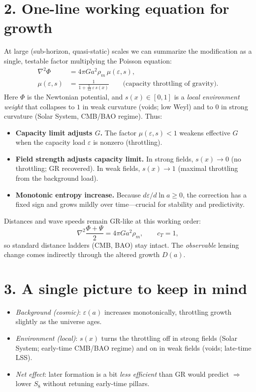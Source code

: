 \documentclass[aps,prd,onecolumn,superscriptaddress,nofootinbib]{revtex4-2}
\newcommand{\eps}{\varepsilon}
\begin{document}
\section*{2. One-line working equation for growth}
At large (sub-horizon, quasi-static) scales we can summarize the modification as a single, testable factor multiplying the Poisson equation:
\begin{align}
\nabla^2\Phi &= 4\pi G a^2 \rho_m \,\mu(\eps,s), \\
\mu(\eps,s) &= \frac{1}{1+\frac{5}{12}\,\eps\,s(x)} \qquad \text{(capacity throttling of gravity)}.
\end{align}
Here $\Phi$ is the Newtonian potential, and $s(x)\!\in[0,1]$ is a \emph{local environment weight} that collapses to $1$ in weak curvature (voids; low Weyl) and to $0$ in strong curvature (Solar System, CMB/BAO regime). Thus:

\begin{itemize}
\item \textbf{Capacity limit adjusts $G$.} The factor $\mu(\eps,s)<1$ weakens effective $G$ when the capacity load $\eps$ is nonzero (throttling).
\item \textbf{Field strength adjusts capacity limit.} In strong fields, $s(x)\!\to\!0$ (no throttling; GR recovered). In weak fields, $s(x)\!\to\!1$ (maximal throttling from the background load).
\item \textbf{Monotonic entropy increase.} Because $d\eps/d\ln a\!\ge\!0$, the correction has a fixed sign and grows mildly over time---crucial for stability and predictivity.
\end{itemize}

Distances and wave speeds remain GR-like at this working order:
\[
\nabla^2\frac{\Phi+\Psi}{2}=4\pi G a^2\rho_m, \qquad c_T=1,
\]
so standard distance ladders (CMB, BAO) stay intact. The \emph{observable} lensing change comes indirectly through the altered growth $D(a)$.

\section*{3. A single picture to keep in mind}
\begin{itemize}
\item \emph{Background (cosmic)}: $\eps(a)$ increases monotonically, throttling growth slightly as the universe ages.
\item \emph{Environment (local)}: $s(x)$ turns the throttling off in strong fields (Solar System; early-time CMB/BAO regime) and on in weak fields (voids; late-time LSS).
\item \emph{Net effect}: later formation is a bit \emph{less efficient} than GR would predict $\Rightarrow$ lower $S_8$ without retuning early-time pillars.
\end{itemize}
\end{document}
